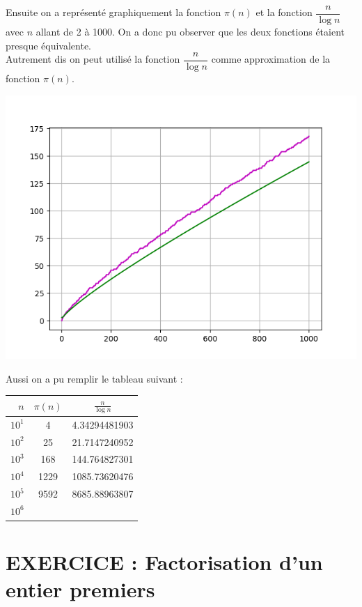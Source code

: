 \documentclass{article}
\begin{document}
Ensuite on a représenté graphiquement la fonction $\pi(n)$ et la fonction $\dfrac{n}{\log n}$ avec $n$ allant de 2 à 1000. On a donc pu observer que les deux fonctions étaient presque équivalente.\\ Autrement dis on peut utilisé la fonction $\dfrac{n}{\log n}$ comme approximation de la fonction $\pi(n)$.

\begin{center}
	\includegraphics[scale=0.5]{graph1.png}
\end{center}
 
Aussi on a pu remplir le tableau suivant :

\begin{center}
\begin{tabular}{r | c | c}
$n$ & $\pi(n)$ & $\frac{n}{\log n}$ \\
\hline
$10^1$ & {4} & {4.34294481903}\\
$10^2$ & {25} & {21.7147240952}\\
$10^3$ & {168} & {144.764827301}\\
$10^4$ & {1229} & {1085.73620476}\\
$10^5$ & {9592} & {8685.88963807}\\
$10^6$ & {} & {}
\end{tabular}
\end{center}

\section{EXERCICE : Factorisation d'un entier premiers}
\end{document}

